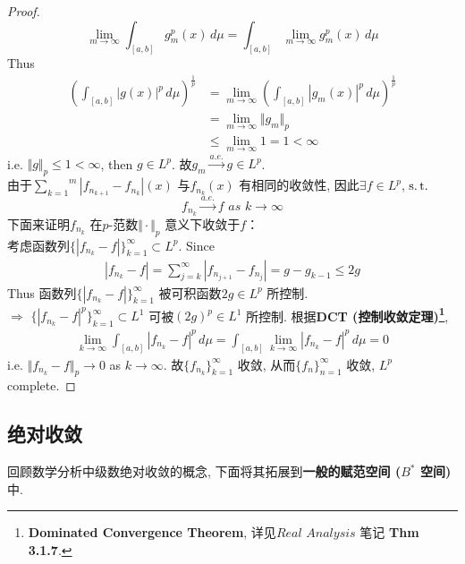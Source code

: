 \begin{thm}
\begin{proof}
			\[ \lim_{m \to \infty} \int_{[a , b]} g_{m}^p(x) \, d\mu = \int_{[a , b]} \lim_{m \to \infty} g_{m}^p(x) \, d\mu \]
			Thus
			\begin{align}
				\left( \int_{[a , b]} \left| g(x) \right|^p \, d\mu \right)^{\tfrac{1}{p}} 
				&= \lim_{m \to \infty} \left( \int_{[a , b]} \left| g_{m}(x) \right|^p \, d\mu \right)^{\tfrac{1}{p}} \\
				&= \lim_{m \to \infty} \big\Vert g_m \big\Vert_p \\
				&\leq \lim_{m \to \infty} 1 
				= 1 < \infty
			\end{align}
			i.e. $\Vert g \Vert_{p} \leq 1 < \infty$, then $g \in L^p$. 故$g_m \overset{a.e.}{\to} g \in L^p$. \\
			由于$\overset{m}{\underset{k = 1}{\sum}} \left| f_{n_{k + 1}} - f_{n_k} \right|(x)$ 与$f_{n_k}(x)$ 有相同的收敛性, 因此$\exists f \in L^p$, $\operatorname{s.t.}$
			\[ f_{n_k} \overset{a.e.}{\to} f \,\, as \,\, k \to \infty \]
			下面来证明$f_{n_k}$ 在$p$-范数$\Vert \cdot \Vert_p$ 意义下收敛于$f$：\\
			考虑函数列$\{ \left| f_{n_k} - f \right| \}_{k = 1}^{\infty} \subset L^p$. Since
			\begin{align}
				\left| f_{n_k} - f \right| 
				= \sum_{j = k}^{\infty} \left| f_{n_{j + 1}} - f_{n_j} \right| 
				= g - g_{k - 1} \leq 2g
			\end{align}
			Thus 函数列$\{ \left| f_{n_k} - f \right| \}_{k = 1}^{\infty}$ 被可积函数$2g \in L^p$ 所控制. \\
			$\Rightarrow \,\, \{ \left| f_{n_k} - f \right|^p \}_{k = 1}^{\infty} \subset L^1$ 可被$(2g)^p \in L^1$ 所控制. 根据\textbf{DCT (控制收敛定理)\footnote{\textbf{Dominated Convergence Theorem}, 详见$Real \,\, Analysis$ 笔记 \textbf{Thm 3.1.7}.}}, 
			\begin{align}
				\lim_{k \to \infty} \int_{[a , b]} \left| f_{n_k} - f \right|^p \, d\mu 
				= \int_{[a , b]} \lim_{k \to \infty} \left| f_{n_k} - f \right|^p \, d\mu = 0
			\end{align}
			i.e. $\Vert f_{n_k} - f \Vert_{p} \to 0$ as $k \to \infty$. 故$\{ f_{n_k} \}_{k = 1}^{\infty}$ 收敛, 从而$\{ f_n \}_{n = 1}^{\infty}$ 收敛, $L^p$ complete.
		\end{proof}
	\end{thm}

\newpage

\subsection{绝对收敛}
	回顾数学分析中级数绝对收敛的概念, 下面将其拓展到\textbf{一般的赋范空间 ($B^*$ 空间)}中. 
	
